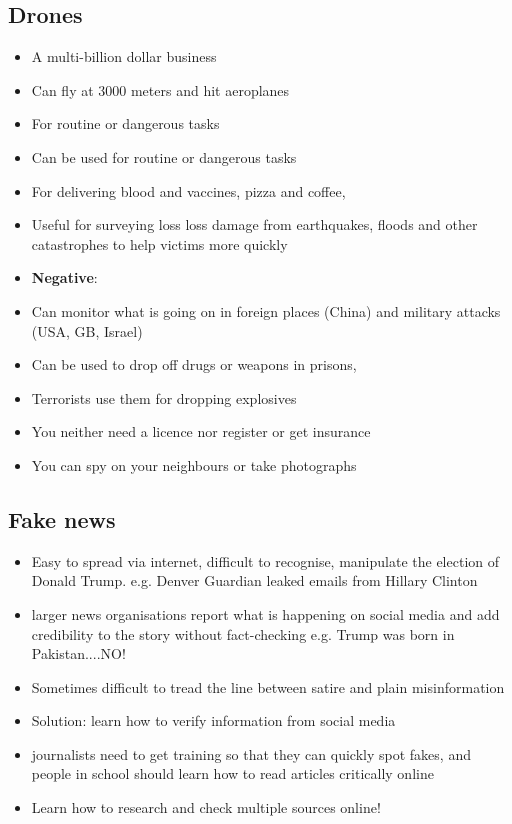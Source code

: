 \documentclass[a5paper,12pt,twoside,titlepage]{scrartcl}
\begin{document}
\subsection{Drones}
\begin{itemize}
	\item A multi-billion dollar business
	\item Can fly at 3000 meters and hit aeroplanes
	\item For routine or dangerous tasks
	\item Can be used for routine or dangerous tasks 
	\item For delivering blood and vaccines, pizza and coffee, 
	\item Useful for surveying loss loss damage from earthquakes, floods and other catastrophes to help victims more quickly
	\item \textbf{Negative}:
	\item Can monitor what is going on in foreign places (China) and military attacks (USA, GB, Israel)
	\item Can be used to drop off drugs or weapons in prisons, 
	\item Terrorists use them for dropping explosives
	\item You neither need a licence nor register or get insurance
	\item You can spy on your neighbours or take photographs
\end{itemize}

\subsection{Fake news}
\begin{itemize}
	\item Easy to spread via internet, difficult to recognise, 
	\subitem manipulate the election of Donald Trump. 
	\subitem e.g. Denver Guardian leaked emails from Hillary Clinton
	\item larger news organisations report what is happening on social media and add credibility to the story without fact-checking
	\subitem e.g. Trump was born in Pakistan....NO!
	\item Sometimes difficult to tread the line between satire and plain misinformation
	\item Solution: learn how to verify information from social media
	\item journalists need to get training so that they can quickly spot fakes, and people in school should learn how to read articles critically online
	\item Learn how to research and check multiple sources online!
\end{itemize}
\end{document}
